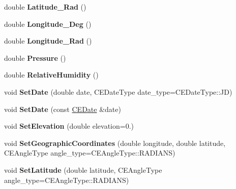 \begin{DoxyCompactItemize}
\item 
\hypertarget{class_c_e_observer_a1e1053a2cb4fa013965f0012bc9ec2ed}{}double {\bfseries Latitude\+\_\+\+Rad} ()\label{class_c_e_observer_a1e1053a2cb4fa013965f0012bc9ec2ed}

\item 
\hypertarget{class_c_e_observer_aae554303d7f4feb13359eb1b1730063c}{}double {\bfseries Longitude\+\_\+\+Deg} ()\label{class_c_e_observer_aae554303d7f4feb13359eb1b1730063c}

\item 
\hypertarget{class_c_e_observer_aecd18686fb2bcdc9ddaa519cf48c4428}{}double {\bfseries Longitude\+\_\+\+Rad} ()\label{class_c_e_observer_aecd18686fb2bcdc9ddaa519cf48c4428}

\item 
\hypertarget{class_c_e_observer_a683ab4983c7a0b5ec59b23a61d3d42c6}{}double {\bfseries Pressure} ()\label{class_c_e_observer_a683ab4983c7a0b5ec59b23a61d3d42c6}

\item 
\hypertarget{class_c_e_observer_a5a99d5f72b2bb09dd49d477c65351e0c}{}double {\bfseries Relative\+Humidity} ()\label{class_c_e_observer_a5a99d5f72b2bb09dd49d477c65351e0c}

\item 
\hypertarget{class_c_e_observer_ac164ff5c5b8ad0026acda27f2657c560}{}void {\bfseries Set\+Date} (double date, C\+E\+Date\+Type date\+\_\+type=C\+E\+Date\+Type\+::\+J\+D)\label{class_c_e_observer_ac164ff5c5b8ad0026acda27f2657c560}

\item 
\hypertarget{class_c_e_observer_ac04674ffc9afd7313fa9fcec46ad84b5}{}void {\bfseries Set\+Date} (const \hyperlink{class_c_e_date}{C\+E\+Date} \&date)\label{class_c_e_observer_ac04674ffc9afd7313fa9fcec46ad84b5}

\item 
\hypertarget{class_c_e_observer_a1165de1f35375064ee9bae389c9bc9c2}{}void {\bfseries Set\+Elevation} (double elevation=0.)\label{class_c_e_observer_a1165de1f35375064ee9bae389c9bc9c2}

\item 
\hypertarget{class_c_e_observer_a4c06185db92f0f087467500427b04cb5}{}void {\bfseries Set\+Geographic\+Coordinates} (double longitude, double latitude, C\+E\+Angle\+Type angle\+\_\+type=C\+E\+Angle\+Type\+::\+R\+A\+D\+I\+A\+N\+S)\label{class_c_e_observer_a4c06185db92f0f087467500427b04cb5}

\item 
\hypertarget{class_c_e_observer_a11e59cdef354a6663c957170032699d8}{}void {\bfseries Set\+Latitude} (double latitude, C\+E\+Angle\+Type angle\+\_\+type=C\+E\+Angle\+Type\+::\+R\+A\+D\+I\+A\+N\+S)\label{class_c_e_observer_a11e59cdef354a6663c957170032699d8}


\end{DoxyCompactItemize}
